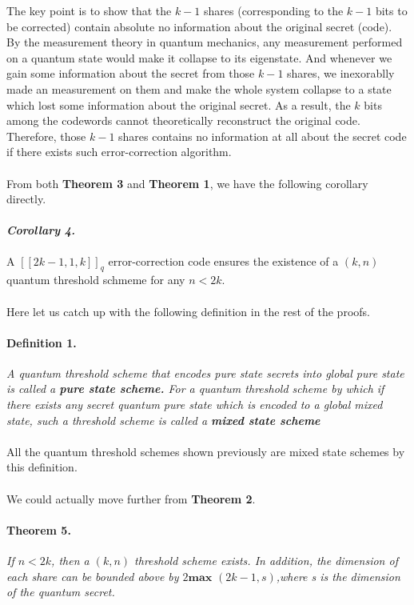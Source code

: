 \documentclass[12pt]{article}
\begin{document}
The key point is to show that the $k-1$ shares (corresponding to the $k-1$ bits to be corrected) contain absolute no information about the original secret (code). By the measurement theory in quantum mechanics, any measurement performed on a quantum state would make it collapse to its eigenstate.
And whenever we gain some information about the secret from those $k-1$ shares, we inexorablly made an measurement on them and make the whole system collapse  to a state which lost some information about the original secret.\cite{Bennett}
As a result, the $k$ bits among the codewords cannot theoretically reconstruct the original code. Therefore, those $k-1$ shares contains no information at all about the secret code if there exists such error-correction algorithm.
\\\\
From both \textbf{Theorem 3} and \textbf{Theorem 1}, we have the following corollary directly.
\paragraph{\textit{Corollary 4.}}
A $[[2k-1,1,k]]_q$ error-correction code ensures the existence of a $(k,n)$ quantum threshold schmeme for any $n < 2k$.
\\\\
Here let us catch up with the following definition in the rest of the proofs.

\paragraph{Definition 1.}
\textit{A quantum threshold scheme that encodes pure state secrets into global pure state is called a \textbf{pure state scheme.} 
For a quantum threshold scheme by which if there exists any secret quantum pure state which is encoded to a global mixed state, such a threshold scheme is called a \textbf{mixed state scheme}}
\\\\
All the quantum threshold schemes shown previously are mixed state schemes by this definition.
\\\\
We could actually move further from \textbf{Theorem 2}.
\paragraph{Theorem 5.}
\textit{If $n < 2k$, then a $(k,n)$ threshold scheme exists. In addition, the dimension of each share can be bounded above by $2\textbf{max }(2k-1,s)$,where s is the dimension of the quantum secret.}
\end{document}
